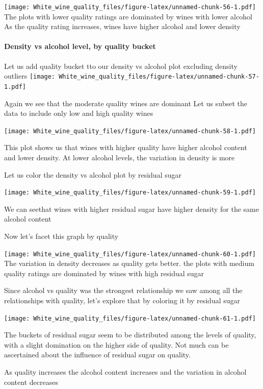 \documentclass[]{article}
\let\oldparagraph\paragraph
\renewcommand{\paragraph}[1]{\oldparagraph{#1}\mbox{}}
\begin{document}
\texttt{[image: White\_wine\_quality\_files/figure-latex/unnamed-chunk-56-1.pdf]}
The plots with lower quality ratings are dominated by wines with lower
alcohol As the quality rating increases, wines have higher alcohol and
lower density

\paragraph{Density vs alcohol level, by quality
bucket}\label{density-vs-alcohol-level-by-quality-bucket}

Let us add quality bucket tto our density vs alcohol plot excluding
density outliers
\texttt{[image: White\_wine\_quality\_files/figure-latex/unnamed-chunk-57-1.pdf]}

Again we see that the moderate quality wines are dominant Let us subset
the data to include only low and high quality wines

\texttt{[image: White\_wine\_quality\_files/figure-latex/unnamed-chunk-58-1.pdf]}

This plot shows us that wines with higher quality have higher alcohol
content and lower density. At lower alcohol levels, the variation in
density is more

Let us color the density vs alcohol plot by residual sugar

\texttt{[image: White\_wine\_quality\_files/figure-latex/unnamed-chunk-59-1.pdf]}

We can seethat wines with higher residual sugar have higher density for
the same alcohol content

Now let's facet this graph by quality

\texttt{[image: White\_wine\_quality\_files/figure-latex/unnamed-chunk-60-1.pdf]}
The variation in density decreases as quality gets better. the plots
with medium quality ratings are dominated by wines with high residual
sugar

Since alcohol vs quality was the strongest relationship we saw among all
the relationships with quality, let's explore that by coloring it by
residual sugar

\texttt{[image: White\_wine\_quality\_files/figure-latex/unnamed-chunk-61-1.pdf]}

The buckets of residual sugar seem to be distributed among the levels of
quality, with a slight domination on the higher side of quality. Not
much can be ascertained about the influence of residual sugar on
quality.

As quality increases the alcohol content increases and the variation in
alcohol content decreases
\end{document}
